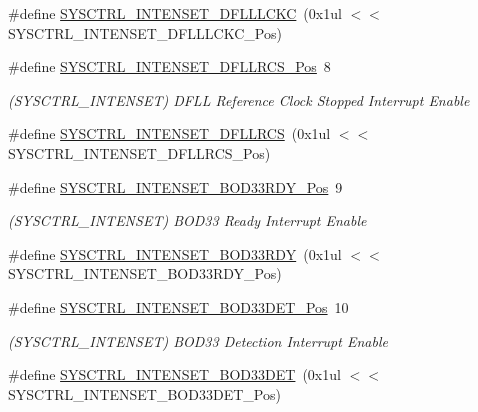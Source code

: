 \begin{DoxyCompactItemize}
\#define \mbox{\hyperlink{group___s_a_m_d21___s_y_s_c_t_r_l_ga88a9693dae8f04c95b4aaa9bb61739d1}{S\+Y\+S\+C\+T\+R\+L\+\_\+\+I\+N\+T\+E\+N\+S\+E\+T\+\_\+\+D\+F\+L\+L\+L\+C\+KC}}~(0x1ul $<$$<$ S\+Y\+S\+C\+T\+R\+L\+\_\+\+I\+N\+T\+E\+N\+S\+E\+T\+\_\+\+D\+F\+L\+L\+L\+C\+K\+C\+\_\+\+Pos)
\item 
\#define \mbox{\hyperlink{group___s_a_m_d21___s_y_s_c_t_r_l_gafe2212fbbae0926a0f9a2ae23db01e22}{S\+Y\+S\+C\+T\+R\+L\+\_\+\+I\+N\+T\+E\+N\+S\+E\+T\+\_\+\+D\+F\+L\+L\+R\+C\+S\+\_\+\+Pos}}~8
\begin{DoxyCompactList}\small\item\em (S\+Y\+S\+C\+T\+R\+L\+\_\+\+I\+N\+T\+E\+N\+S\+ET) D\+F\+LL Reference Clock Stopped Interrupt Enable \end{DoxyCompactList}\item 
\#define \mbox{\hyperlink{group___s_a_m_d21___s_y_s_c_t_r_l_ga8b3900f68544b05104e54db635d581c6}{S\+Y\+S\+C\+T\+R\+L\+\_\+\+I\+N\+T\+E\+N\+S\+E\+T\+\_\+\+D\+F\+L\+L\+R\+CS}}~(0x1ul $<$$<$ S\+Y\+S\+C\+T\+R\+L\+\_\+\+I\+N\+T\+E\+N\+S\+E\+T\+\_\+\+D\+F\+L\+L\+R\+C\+S\+\_\+\+Pos)
\item 
\#define \mbox{\hyperlink{group___s_a_m_d21___s_y_s_c_t_r_l_ga39f105b334e50f234a921a2173c05016}{S\+Y\+S\+C\+T\+R\+L\+\_\+\+I\+N\+T\+E\+N\+S\+E\+T\+\_\+\+B\+O\+D33\+R\+D\+Y\+\_\+\+Pos}}~9
\begin{DoxyCompactList}\small\item\em (S\+Y\+S\+C\+T\+R\+L\+\_\+\+I\+N\+T\+E\+N\+S\+ET) B\+O\+D33 Ready Interrupt Enable \end{DoxyCompactList}\item 
\#define \mbox{\hyperlink{group___s_a_m_d21___s_y_s_c_t_r_l_ga90f9f3f3e9b4090fc4666fd7edec96d6}{S\+Y\+S\+C\+T\+R\+L\+\_\+\+I\+N\+T\+E\+N\+S\+E\+T\+\_\+\+B\+O\+D33\+R\+DY}}~(0x1ul $<$$<$ S\+Y\+S\+C\+T\+R\+L\+\_\+\+I\+N\+T\+E\+N\+S\+E\+T\+\_\+\+B\+O\+D33\+R\+D\+Y\+\_\+\+Pos)
\item 
\#define \mbox{\hyperlink{group___s_a_m_d21___s_y_s_c_t_r_l_gafacd2da4a05e3d0cf61f4540c95e252e}{S\+Y\+S\+C\+T\+R\+L\+\_\+\+I\+N\+T\+E\+N\+S\+E\+T\+\_\+\+B\+O\+D33\+D\+E\+T\+\_\+\+Pos}}~10
\begin{DoxyCompactList}\small\item\em (S\+Y\+S\+C\+T\+R\+L\+\_\+\+I\+N\+T\+E\+N\+S\+ET) B\+O\+D33 Detection Interrupt Enable \end{DoxyCompactList}\item 
\#define \mbox{\hyperlink{group___s_a_m_d21___s_y_s_c_t_r_l_ga90fd75e11a9691d68cdfa7c33b714358}{S\+Y\+S\+C\+T\+R\+L\+\_\+\+I\+N\+T\+E\+N\+S\+E\+T\+\_\+\+B\+O\+D33\+D\+ET}}~(0x1ul $<$$<$ S\+Y\+S\+C\+T\+R\+L\+\_\+\+I\+N\+T\+E\+N\+S\+E\+T\+\_\+\+B\+O\+D33\+D\+E\+T\+\_\+\+Pos)

\end{DoxyCompactItemize}
